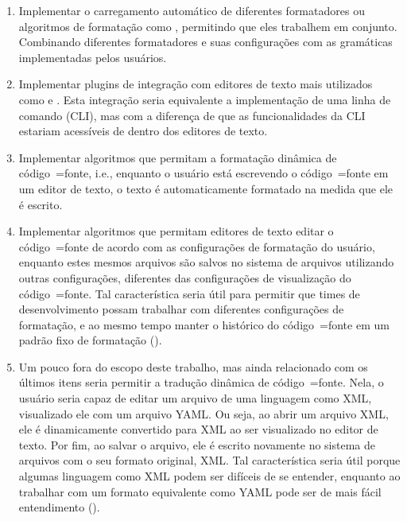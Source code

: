\begin{enumerate}
%
\item Implementar o carregamento automático de diferentes formatadores ou
algoritmos de formatação como ,
permitindo que eles trabalhem em conjunto.
Combinando diferentes formatadores e
suas configurações com as gramáticas implementadas pelos usuários.
\item Implementar plugins de integração com editores de texto mais utilizados como  e
.
Esta integração seria equivalente a implementação de uma linha de comando (CLI),
mas com a diferença de que as funcionalidades da CLI estariam acessíveis de dentro dos editores de texto.
\item Implementar algoritmos que permitam a formatação dinâmica de código~=fonte,
i.e.,
enquanto o usuário está escrevendo o código~=fonte em um editor de texto,
o texto é automaticamente formatado na medida que ele é escrito.
\item Implementar algoritmos que permitam editores de texto editar o código~=fonte de acordo com as configurações de formatação do usuário,
enquanto estes mesmos arquivos são salvos no sistema de arquivos utilizando outras configurações,
diferentes das configurações de visualização do código~=fonte.
Tal característica seria útil para permitir que times de desenvolvimento possam trabalhar com diferentes configurações de formatação,
e ao mesmo tempo manter o histórico do código~=fonte em um padrão fixo de formatação ().
\item Um pouco fora do escopo deste trabalho,
mas ainda relacionado com os últimos itens seria permitir a tradução dinâmica de código~=fonte.
Nela,
o usuário seria capaz de editar um arquivo de uma linguagem como XML,
visualizado ele com um arquivo YAML.
Ou seja,
ao abrir um arquivo XML,
ele é dinamicamente convertido para XML ao ser visualizado no editor de texto.
Por fim,
ao salvar o arquivo,
ele é escrito novamente no sistema de arquivos com o seu formato original,
XML.
Tal característica seria útil porque algumas linguagem como XML podem ser difíceis de se entender,
enquanto ao trabalhar com um formato equivalente como YAML pode ser de mais fácil entendimento ().
\end{enumerate}%


